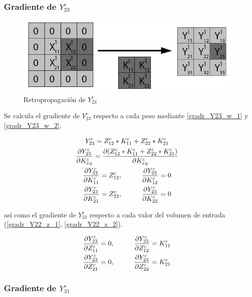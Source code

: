 \subsubsection{Gradiente de $Y^c_{23}$}

\begin{figure}[H]
	\centering
	\includegraphics[width=0.8\linewidth]{imagenes/conv_back_padding_6.jpg} 
	\caption{Retropropagación de $Y^c_{23}$}
\end{figure}

Se calcula el gradiente de $Y^c_{23}$ respecto a cada peso mediante \ref{gradr_Y23_w_1} y \ref{gradr_Y23_w_2},


\begin{gather}
	Y^c_{23} = Z^c_{12} * K^c_{11} + Z^c_{22} * K^c_{21} \\
	\frac{\partial Y^c_{23}}{\partial K^c_{xy}} = \frac{\partial (Z^c_{12} * K^c_{11} + Z^c_{22} * K^c_{21})}{\partial K^c_{xy}} \\
	\frac{\partial Y^c_{23}}{\partial K^c_{11}} = Z^c_{12}, \hspace{10mm} \frac{\partial Y^c_{23}}{\partial K^c_{12}} = 0 \label{gradr_Y23_w_1} \\
	\frac{\partial Y^c_{23}}{\partial K^c_{21}} = Z^c_{22}, \hspace{10mm} \frac{\partial Y^c_{23}}{\partial K^c_{22}} = 0 \label{gradr_Y23_w_2}
\end{gather}

así como el gradiente de $Y^c_{23}$ respecto a cada valor del volumen de entrada (\ref{gradr_Y22_z_1}, \ref{gradr_Y22_z_2}).


\begin{gather}
	\frac{\partial Y^c_{23}}{\partial Z^c_{11}} = 0, \hspace{10mm} \frac{\partial Y^c_{23}}{\partial Z^c_{12}} = K^c_{11}\\
	\frac{\partial Y^c_{23}}{\partial Z^c_{21}} = 0, \hspace{10mm} \frac{\partial Y^c_{23}}{\partial Z^c_{22}} = K^c_{21}
\end{gather}

\subsubsection{Gradiente de $Y^c_{31}$}

